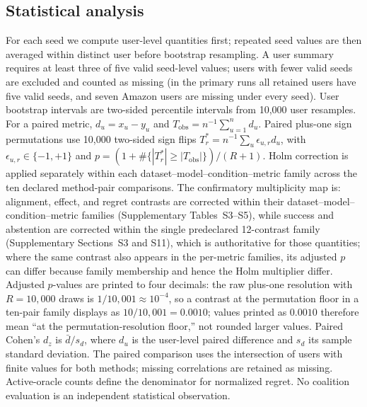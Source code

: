 \documentclass[manuscript,screen,review,anonymous]{acmart}
\begin{document}
\subsection{Statistical analysis}
For each seed we compute user-level quantities first; repeated seed values are then averaged within distinct user before bootstrap resampling. A user summary requires at least three of five valid seed-level values; users with fewer valid seeds are excluded and counted as missing (in the primary runs all retained users have five valid seeds, and seven Amazon users are missing under every seed). User bootstrap intervals are two-sided percentile intervals from 10,000 user resamples. For a paired metric, $d_u=x_u-y_u$ and $T_{\mathrm{obs}}=n^{-1}\sum_{u=1}^{n}d_u$. Paired plus-one sign permutations use 10,000 two-sided sign flips $T_r^*=n^{-1}\sum_u\epsilon_{u,r}d_u$, with $\epsilon_{u,r}\in\{-1,+1\}$ and $p=(1+\#\{|T_r^*|\ge|T_{\mathrm{obs}}|\})/(R+1)$. Holm correction is applied separately within each dataset--model--condition--metric family across the ten declared method-pair comparisons. The confirmatory multiplicity map is: alignment, effect, and regret contrasts are corrected within their dataset--model--condition--metric families (Supplementary Tables~S3--S5), while success and abstention are corrected within the single predeclared 12-contrast family (Supplementary Sections~S3 and S11), which is authoritative for those quantities; where the same contrast also appears in the per-metric families, its adjusted $p$ can differ because family membership and hence the Holm multiplier differ. Adjusted $p$-values are printed to four decimals: the raw plus-one resolution with $R=10{,}000$ draws is $1/10{,}001\approx10^{-4}$, so a contrast at the permutation floor in a ten-pair family displays as $10/10{,}001=0.0010$; values printed as $0.0010$ therefore mean ``at the permutation-resolution floor,'' not rounded larger values. Paired Cohen's $d_z$ is $\bar d/s_d$, where $d_u$ is the user-level paired difference and $s_d$ its sample standard deviation. The paired comparison uses the intersection of users with finite values for both methods; missing correlations are retained as missing. Active-oracle counts define the denominator for normalized regret. No coalition evaluation is an independent statistical observation.
\end{document}
